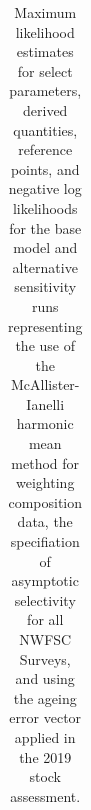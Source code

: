 \documentclass[
  english,
]{article}
\begin{document}
\pagebreak

\begin{landscape}

\begingroup
\fontsize{8.0pt}{9.0pt}\selectfont

\begin{longtable}{>{\raggedright\arraybackslash}p{\dimexpr 131.25pt -2\tabcolsep-1.5\arrayrulewidth}>{\raggedleft\arraybackslash}p{\dimexpr 90.00pt -2\tabcolsep-1.5\arrayrulewidth}>{\raggedleft\arraybackslash}p{\dimexpr 90.00pt -2\tabcolsep-1.5\arrayrulewidth}>{\raggedleft\arraybackslash}p{\dimexpr 90.00pt -2\tabcolsep-1.5\arrayrulewidth}>{\raggedleft\arraybackslash}p{\dimexpr 90.00pt -2\tabcolsep-1.5\arrayrulewidth}}

\caption{\label{tbl-sens-2}Maximum likelihood estimates for select
parameters, derived quantities, reference points, and negative log
likelihoods for the base model and alternative sensitivity runs
representing the use of the McAllister-Ianelli harmonic mean method for
weighting composition data, the specifiation of asymptotic selectivity
for all NWFSC Surveys, and using the ageing error vector applied in the
2019 stock assessment.}

\tabularnewline


\end{longtable}
\end{landscape}
\end{document}

